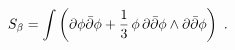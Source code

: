 \begin{equation}
\label{P}
S_{\beta}=\int\left(\partial\phi\bar{\partial}\phi
+{1\over 3}\,\phi\,\partial\bar{\partial}\phi\wedge
\partial\bar{\partial}\phi\right) \ .
\end{equation}

